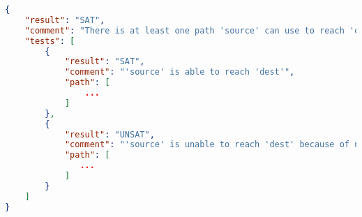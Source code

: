 \begin{lstlisting}[language=JSON, caption=VerificationResults example]
{
    "result": "SAT",
    "comment": "There is at least one path 'source' can use to reach 'dest'. See all the available paths below",
    "tests": [
        {
            "result": "SAT",
            "comment": "'source' is able to reach 'dest'",
            "path": [
                ...
            ]
        },
        {
            "result": "UNSAT",
            "comment": "'source' is unable to reach 'dest' because of node 'firewall'",
            "path": [
               ...
            ]
        }
    ]
}
\end{lstlisting}




